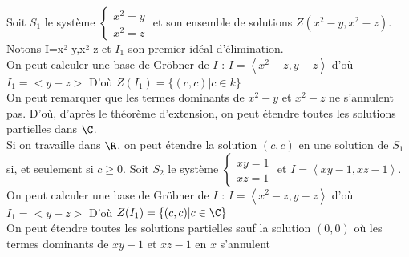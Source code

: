 Soit $S_1$ le syst\`eme $\begin{cases}x^2=y \\ x^2=z \end{cases}$ et son ensemble de solutions $Z(x^2-y,x^2-z)$. Notons I=\left\langle x²-y,x²-z \right\rangle et $I_1$ son premier idéal d'élimination.\\
On peut calculer une base de Gröbner de $I$ : $I=\left\langle x^2-z,y-z\right\rangle$ d'où $I_1=<y-z>$
D'où $Z(I_1)=\{(c,c) | c \in k\}$ \\
On peut remarquer que les termes dominants de $x^2-y$ et $x^2-z$ ne s'annulent pas. D'où, d'après le théorème d'extension, on peut étendre toutes les solutions partielles dans $\C$.\\
Si on travaille dans $\R$, on peut étendre la solution $(c,c)$ en une solution de $S_1$ si, et seulement si $c\geq 0$. 
Soit $S_2$ le syst\`eme $\begin{cases}xy=1 \\ xz=1 \end{cases}$ et $I=\left\langle xy-1,xz-1 \right\rangle$. \\
On peut calculer une base de Gröbner de $I$ : $I=\left\langle x^2-z,y-z\right\rangle$ d'où $I_1=<y-z>$
D'où $Z(I_1)=\{(c,c) | c \in \C\}$ \\
On peut étendre toutes les solutions partielles sauf la solution $(0,0)$ où les termes dominants de $xy-1$ et $xz-1$ en $x$ s'annulent


